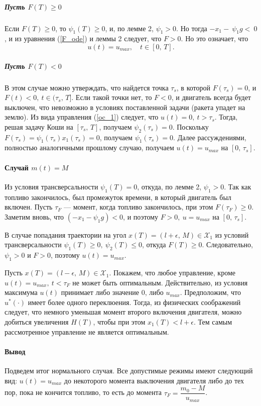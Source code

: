 \documentclass[16pt]{article}
\newcommand\A{(\cdot)}
\newcommand\X{\mathcal{X}}
\begin{document}
\subparagraph{Пусть $F(T) \geqslant 0$} Если $F(T) \geqslant 0$, то $\psi_1(T) \geqslant 0$, и, по лемме 2, 
$\psi_1 > 0$. Но тогда
$-x_1 -~\psi_1g <~0$, и из уравнения (\ref{F_ode}) и леммы 2 следует, что $F > 0$. Но это означает, что
$$u(t) = u_{max}, \quad t \in [0,\,T].$$

\subparagraph{Пусть $F(T) < 0$} В этом случае можно утверждать, что найдется точка $\tau_s$, в которой 
$F(\tau_s) = 0$, и $F(t) < 0, \ t \in (\tau_s,\,T]$. Если такой точки нет, то $F < 0$, и двигатель всегда 
будет выключен, что невозможно в условиях поставленной задачи (ракета упадет на землю). 
Из вида управления (\ref{oc_1})
 следует, что $u(t) = 0, \ t > \tau_s$. Тогда, решая задачу Коши на $[\tau_s,\,T]$, получаем $\psi_2(\tau_s) = 0$.
Поскольку $F(\tau_s) = \psi_1(\tau_s)x_1(\tau_s) = 0$, получаем $\psi_1(\tau_s) = 0$. Далее рассуждениями, полностью
 аналогичными прошлому случаю, получаем $u(t) = u_{max}$ на $[0,\,\tau_s]$.
 
\paragraph{Случай $m(t) = M$}
Из условия трансверсальности $\psi_1(T) = 0$, откуда, по лемме 2, $\psi_1 > 0$. Так как топливо закончилось, был
промежуток времени, в который двигатель был включен. Пусть $\tau_F$ --- момент, когда топливо закончилось, при этом
$F(\tau_F) \geqslant 0$. Заметим вновь, что $(-x_1 - \psi_1g) < 0$, и поэтому $F > 0,\ u = u_{max}$ 
на $[0,\,\tau_s]$. 

В случае попадания траектории на угол $x(T) = (l+\epsilon,\, M) \in \X_1$ из условий трансверсальности 
$\psi_1(T) \geqslant 0, \ \psi_2(T) \leqslant 0$, откуда $F(T) \geqslant 0$. Следовательно, $\psi_1 > 0$ и $F > 0$, 
поэтому $u(t) = u_{max}$.

Пусть $x(T) = (l-\epsilon,\, M) \in \X_1$. Покажем, что любое управление, кроме $u(t) = u_{max},\ t < \tau_F$
не может быть оптимальным. Действительно, из условия максимума $u(t)$ принимает либо значение $0$, либо
$u_{max}$. Предположим, что $u^*\A$ имеет более одного переклюения. Тогда, из физических соображений следует, что
немного уменьшая момент второго включения двигателя, можно добиться увеличения $H(T)$, чтобы при этом 
$x_1(T) < l + \epsilon$. Тем самым рассмотренное управление не является оптимальным. 

\paragraph{Вывод}
Подведем итог нормального случая. Все допустимые режимы имеют следующий вид: $u(t) = u_{max}$ до некоторого момента 
выключения двигателя либо до тех пор, пока не кончится топливо, то есть до момента $\tau_F = \dfrac{m_0-M}{u_{max}}$.
\end{document}
